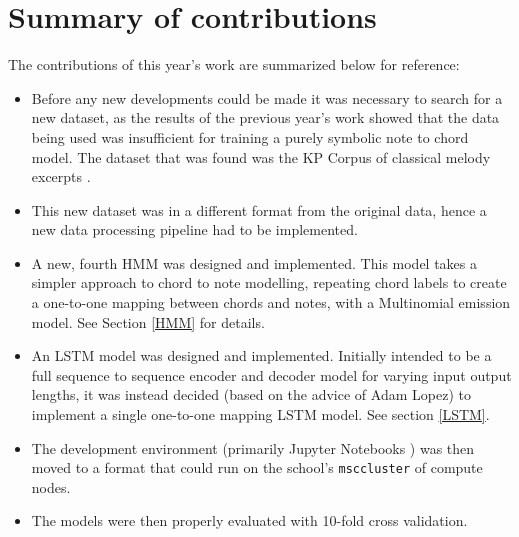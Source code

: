 \documentclass[bsc,singlespacing,logo, parskip, deptreport]{infthesis}
\begin{document}

\section{Summary of contributions}

The contributions of this year's work are summarized below for reference:

\begin{itemize}
  \item Before any new developments could be made it was necessary to search for a new dataset, as the results of the previous year's work showed that the data being used was insufficient for training a purely symbolic note to chord model. The dataset that was found was the KP Corpus of classical melody excerpts \cite{kostka2009tonal}.
  \item This new dataset was in a different format from the original data, hence a new data processing pipeline had to be implemented.
  \item A new, fourth HMM was designed and implemented. This model takes a simpler approach to chord to note modelling, repeating chord labels to create a one-to-one mapping between chords and notes, with a Multinomial emission model. See Section \ref{HMM} for details.
  \item An LSTM model was designed and implemented. Initially intended to be a full sequence to sequence encoder and decoder model for varying input output lengths, it was instead decided (based on the advice of Adam Lopez) to implement a single one-to-one mapping LSTM model. See section \ref{LSTM}.
  \item The development environment (primarily Jupyter Notebooks \cite{ragan2014jupyter}) was then moved to a format that could run on the school's {\tt msccluster} of compute nodes.
  \item The models were then properly evaluated with 10-fold cross validation.
\end{itemize}
\end{document}
